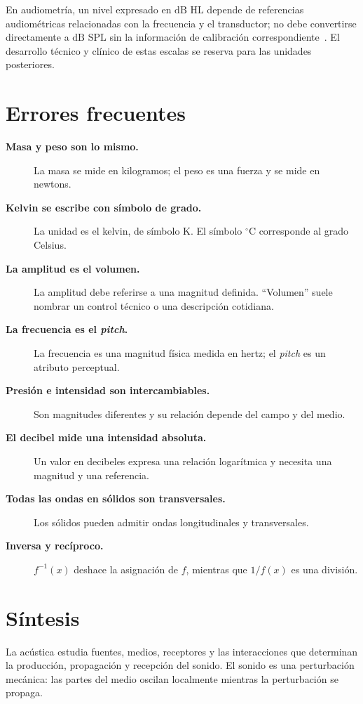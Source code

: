 En audiometría, un nivel expresado en \(\text{dB HL}\) depende de referencias audiométricas relacionadas con la frecuencia y el transductor; no debe convertirse directamente a \(\text{dB SPL}\) sin la información de calibración correspondiente~\cite{iso389_1_2017,iso8253_1_2010}. El desarrollo técnico y clínico de estas escalas se reserva para las unidades posteriores.

\section{Errores frecuentes}
\label{sec:u1-errores}

\begin{description}
    \item[\textbf{Masa y peso son lo mismo.}] La masa se mide en kilogramos; el peso es una fuerza y se mide en newtons.
    \item[\textbf{Kelvin se escribe con símbolo de grado.}] La unidad es el kelvin, de símbolo \(\text{K}\). El símbolo \(^{\circ}\text{C}\) corresponde al grado Celsius.
    \item[\textbf{La amplitud es el volumen.}] La amplitud debe referirse a una magnitud definida. ``Volumen'' suele nombrar un control técnico o una descripción cotidiana.
    \item[\textbf{La frecuencia es el \emph{pitch}.}] La frecuencia es una magnitud física medida en hertz; el \emph{pitch} es un atributo perceptual.
    \item[\textbf{Presión e intensidad son intercambiables.}] Son magnitudes diferentes y su relación depende del campo y del medio.
    \item[\textbf{El decibel mide una intensidad absoluta.}] Un valor en decibeles expresa una relación logarítmica y necesita una magnitud y una referencia.
    \item[\textbf{Todas las ondas en sólidos son transversales.}] Los sólidos pueden admitir ondas longitudinales y transversales.
    \item[\textbf{Inversa y recíproco.}] \(f^{-1}(x)\) deshace la asignación de \(f\), mientras que \(1/f(x)\) es una división.
\end{description}

\section{Síntesis}
\label{sec:u1-sintesis}

La acústica estudia fuentes, medios, receptores y las interacciones que determinan la producción, propagación y recepción del sonido. El sonido es una perturbación mecánica: las partes del medio oscilan localmente mientras la perturbación se propaga.

